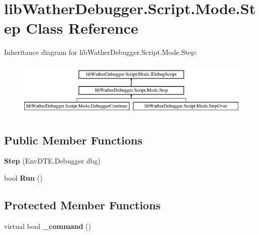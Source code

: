 \hypertarget{classlib_wather_debugger_1_1_script_1_1_mode_1_1_step}{\section{lib\+Wather\+Debugger.\+Script.\+Mode.\+Step Class Reference}
\label{classlib_wather_debugger_1_1_script_1_1_mode_1_1_step}
}
Inheritance diagram for lib\+Wather\+Debugger.\+Script.\+Mode.\+Step\+:\begin{figure}[H]
\begin{center}
\leavevmode
\includegraphics[height=2.692308cm]{classlib_wather_debugger_1_1_script_1_1_mode_1_1_step}
\end{center}
\end{figure}
\subsection*{Public Member Functions}
\begin{DoxyCompactItemize}
\item 
\hypertarget{classlib_wather_debugger_1_1_script_1_1_mode_1_1_step_a377b9fffdb2363ed04e7c9982ac84a32}{{\bfseries Step} (Env\+D\+T\+E.\+Debugger dbg)}\label{classlib_wather_debugger_1_1_script_1_1_mode_1_1_step_a377b9fffdb2363ed04e7c9982ac84a32}

\item 
\hypertarget{classlib_wather_debugger_1_1_script_1_1_mode_1_1_step_a861964b6f8a3bec9267a270149fad8e9}{bool {\bfseries Run} ()}\label{classlib_wather_debugger_1_1_script_1_1_mode_1_1_step_a861964b6f8a3bec9267a270149fad8e9}

\end{DoxyCompactItemize}
\subsection*{Protected Member Functions}
\begin{DoxyCompactItemize}
\item 
\hypertarget{classlib_wather_debugger_1_1_script_1_1_mode_1_1_step_af8937af6234da21b7849b72f8445bd97}{virtual bool {\bfseries \+\_\+command} ()}\label{classlib_wather_debugger_1_1_script_1_1_mode_1_1_step_af8937af6234da21b7849b72f8445bd97}

\end{DoxyCompactItemize}
